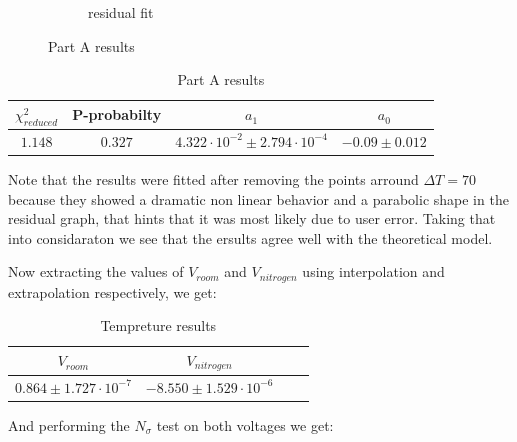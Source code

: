 \documentclass[12pt,a4paper]{article}
\begin{document}
\begin{figure}[htbp]
\begin{subfigure}[b]{0.48\textwidth}
      \caption{residual fit}
      \label{fig:partA2}
    \end{subfigure}
    \caption{Part A results}
    \label{fig:partA_results}
  \end{figure}
  
  \begin{table}[htbp]
    \centering
    \label{tab:partA_summary}
    \begin{tabular}{@{}cccc@{}}
      \toprule
      $\chi ^2_{reduced}$ & P-probabilty & $a_1$ & $a_0$ \\
      \midrule
      $1.148$ & $0.327$ & $4.322 \cdot 10^{-2} \pm 2.794 \cdot 10^{-4}$ & $-0.09 \pm 0.012$ \\
      \bottomrule
    \end{tabular}
    \caption{Part A results}
  \end{table}
Note that the results were fitted after removing the points arround  $\Delta T = 70$ because they showed a dramatic non linear behavior and a parabolic shape in the residual graph, that hints that it was most likely due to user error.
Taking that into considaraton we see that the ersults agree well with the theoretical model.

Now extracting the values of $V_{room}$ and $V_{nitrogen}$ using interpolation and extrapolation respectively, we get: 
\begin{table}[htbp]
    \centering
    \label{Part A tempreture results}
    \begin{tabular}{@{}cccc@{}}
      \toprule
       $V_{room}$ & $V_{nitrogen}$ \\
      \midrule
      $0.864 \pm 1.727 \cdot 10^{-7}$ & $-8.550 \pm 1.529 \cdot 10^{-6}$ \\
      \bottomrule
    \end{tabular}
    \caption{Tempreture results}
\end{table}
\pagebreak

And performing the $N_\sigma$ test on both voltages we get:
\end{document}
